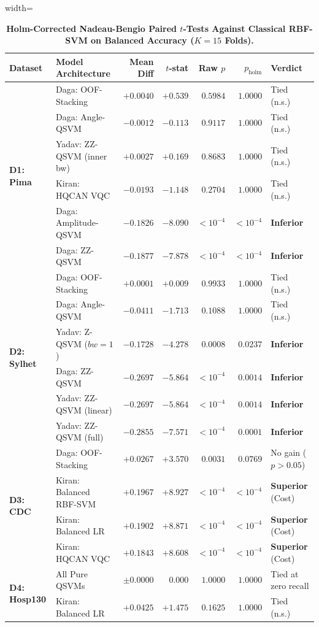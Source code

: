 \documentclass[journal,twocolumn]{IEEEtran}
\begin{document}
\begin{table}[htbp]
\centering\footnotesize
\caption{\textbf{Holm-Corrected Nadeau-Bengio Paired $t$-Tests Against Classical RBF-SVM on Balanced Accuracy ($K=15$ Folds).}}
\label{tab:significance}
\begin{adjustbox}{width=\columnwidth}
\begin{tabular}{llrrrrl}
\toprule
\textbf{Dataset} & \textbf{Model Architecture} & \textbf{Mean Diff} & \textbf{$t$-stat} & \textbf{Raw $p$} & \textbf{$p_{\text{holm}}$} & \textbf{Verdict} \\
\midrule
\multirow{6}{*}{\textbf{D1: Pima}} 
& Daga: OOF-Stacking & $+0.0040$ & $+0.539$ & $0.5984$ & $1.0000$ & Tied (n.s.) \\
& Daga: Angle-QSVM & $-0.0012$ & $-0.113$ & $0.9117$ & $1.0000$ & Tied (n.s.) \\
& Yadav: ZZ-QSVM (inner bw) & $+0.0027$ & $+0.169$ & $0.8683$ & $1.0000$ & Tied (n.s.) \\
& Kiran: HQCAN VQC & $-0.0193$ & $-1.148$ & $0.2704$ & $1.0000$ & Tied (n.s.) \\
& Daga: Amplitude-QSVM & $-0.1826$ & $-8.090$ & $<10^{-4}$ & $<10^{-4}$ & \textbf{Inferior} \\
& Daga: ZZ-QSVM & $-0.1877$ & $-7.878$ & $<10^{-4}$ & $<10^{-4}$ & \textbf{Inferior} \\
\midrule
\multirow{6}{*}{\textbf{D2: Sylhet}} 
& Daga: OOF-Stacking & $+0.0001$ & $+0.009$ & $0.9933$ & $1.0000$ & Tied (n.s.) \\
& Daga: Angle-QSVM & $-0.0411$ & $-1.713$ & $0.1088$ & $1.0000$ & Tied (n.s.) \\
& Yadav: Z-QSVM ($bw=1$) & $-0.1728$ & $-4.278$ & $0.0008$ & $0.0237$ & \textbf{Inferior} \\
& Daga: ZZ-QSVM & $-0.2697$ & $-5.864$ & $<10^{-4}$ & $0.0014$ & \textbf{Inferior} \\
& Yadav: ZZ-QSVM (linear) & $-0.2697$ & $-5.864$ & $<10^{-4}$ & $0.0014$ & \textbf{Inferior} \\
& Yadav: ZZ-QSVM (full) & $-0.2855$ & $-7.571$ & $<10^{-4}$ & $0.0001$ & \textbf{Inferior} \\
\midrule
\multirow{4}{*}{\textbf{D3: CDC}} 
& Daga: OOF-Stacking & $+0.0267$ & $+3.570$ & $0.0031$ & $0.0769$ & No gain ($p > 0.05$) \\
& Kiran: Balanced RBF-SVM & $+0.1967$ & $+8.927$ & $<10^{-4}$ & $<10^{-4}$ & \textbf{Superior} (Cost) \\
& Kiran: Balanced LR & $+0.1902$ & $+8.871$ & $<10^{-4}$ & $<10^{-4}$ & \textbf{Superior} (Cost) \\
& Kiran: HQCAN VQC & $+0.1843$ & $+8.608$ & $<10^{-4}$ & $<10^{-4}$ & \textbf{Superior} (Cost) \\
\midrule
\multirow{2}{*}{\textbf{D4: Hosp130}} 
& All Pure QSVMs & $\pm0.0000$ & $0.000$ & $1.0000$ & $1.0000$ & Tied at zero recall \\
& Kiran: Balanced LR & $+0.0425$ & $+1.475$ & $0.1625$ & $1.0000$ & Tied (n.s.) \\
\bottomrule
\end{tabular}
\end{adjustbox}
\end{table}
\end{document}
